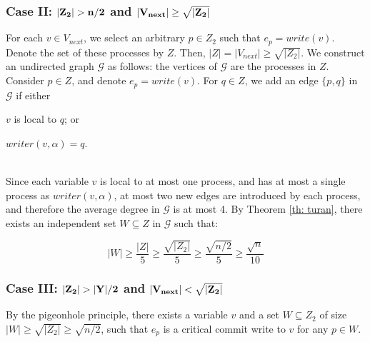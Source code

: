 \subsubsection*{\hspace{5mm} Case II: $\bf |Z_2| > n/2$ and $\bf |V_{next}| \geq \sqrt{|Z_2|}$}
For each $v \in V_{next}$, we select an arbitrary $p \in Z_2$ such that $e_p = write(v)$. Denote the set of these processes by $Z$. Then, $|Z|=|V_{next}| \geq \sqrt{|Z_2|}$.
\newline We construct an undirected graph $\mathcal{G}$ as follows: the vertices of $\mathcal{G}$ are the processes in $Z$. Consider $p \in Z$, and denote $e_p = write(v)$. For $q \in Z$, we add an edge $\{p,q\}$ in $\mathcal{G}$ if either
\begin{inparaenum}
	\item $v$ is local to $q$; or
	\item $writer(v,\alpha) = q$.
\end{inparaenum}
\\ Since each variable $v$ is local to at most one process, and has at most a single process as $writer(v,\alpha)$, at most two new edges are introduced by each process, and therefore the average degree in $\mathcal{G}$ is at most 4. By Theorem \ref{th: turan}, there exists an independent set $W \subseteq Z$ in $\mathcal{G}$ such that:

$$ |W| \geq \frac{|Z|}{5} \geq \frac{\sqrt{|Z_2|}}{5} \geq \frac{\sqrt{n/2}}{5} \geq \frac{\sqrt{n}}{10} $$

\subsubsection*{\hspace{5mm} Case III: $\bf |Z_2| > |Y|/2$ and $\bf |V_{next}| < \sqrt{|Z_2|}$}
By the pigeonhole principle, there exists a variable $v$ and a set $W \subseteq Z_2$ of size $|W| \geq \sqrt{|Z_2|} \geq \sqrt{n/2}$, such that $e_p$ is a critical commit write to $v$ for any $p \in W$.

